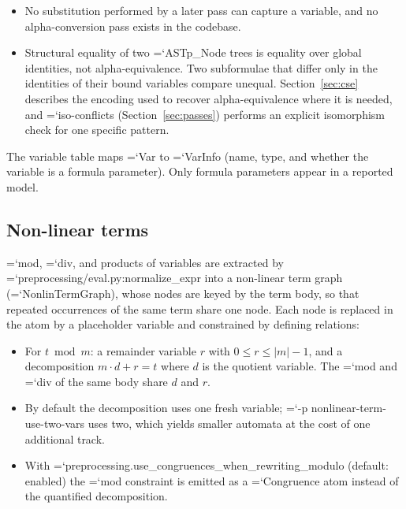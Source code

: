 \documentclass[10pt,a4paper]{article}
\newcommand{\code}[1]{{\small\ttfamily\hyphenchar\font=`\-\relax #1}}
\begin{document}
\begin{itemize}
  \item No substitution performed by a later pass can capture a variable, and no alpha-conversion pass
        exists in the codebase.
  \item Structural equality of two \code{ASTp\_Node} trees is equality over global identities, not
        alpha-equivalence.  Two subformulae that differ only in the identities of their bound variables
        compare unequal.  Section~\ref{sec:cse} describes the encoding used to recover
        alpha-equivalence where it is needed, and \code{iso-conflicts} (Section~\ref{sec:passes})
        performs an explicit isomorphism check for one specific pattern.
\end{itemize}

The variable table maps \code{Var} to \code{VarInfo} (name, type, and whether the variable is a
formula parameter).  Only formula parameters appear in a reported model.

\subsection{Non-linear terms}

\code{mod}, \code{div}, and products of variables are extracted by
\code{preprocessing/eval.py:\allowbreak normalize\_\allowbreak expr} into a non-linear term graph
(\code{NonlinTermGraph}), whose nodes are keyed by the term body, so that repeated occurrences of the
same term share one node.  Each node is replaced in the atom by a placeholder variable and constrained
by defining relations:

\begin{itemize}
  \item For $t \bmod m$: a remainder variable $r$ with $0 \leq r \leq |m| - 1$, and a decomposition
        $m \cdot d + r = t$ where $d$ is the quotient variable.  The \code{mod} and \code{div} of the
        same body share $d$ and $r$.
  \item By default the decomposition uses one fresh variable; \code{-p nonlinear-term-use-two-vars}
        uses two, which yields smaller automata at the cost of one additional track.
  \item With \code{preprocessing.\allowbreak use\_\allowbreak congruences\_\allowbreak when\_\allowbreak rewriting\_\allowbreak modulo} (default: enabled) the
        \code{mod} constraint is emitted as a \code{Congruence} atom instead of the quantified
        decomposition.
\end{itemize}
\end{document}
